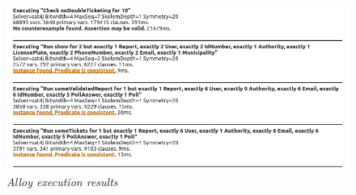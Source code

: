 \begin{figure}[H]
  \centering
  \includegraphics[origin=c,width=\textwidth,height=.95\textheight,keepaspectratio]{RASD_Images/AlloyWorlds/executionResults.jpg}
  \caption{\textit{Alloy execution results}}
\end{figure}
